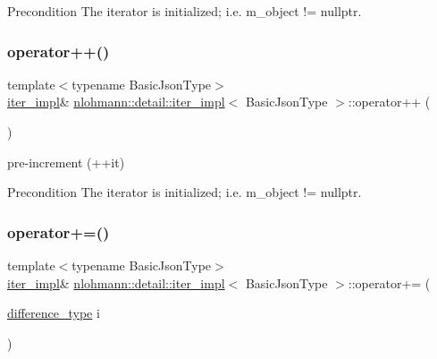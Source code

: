 \begin{DoxyPrecond}{Precondition}
The iterator is initialized; i.\+e. {\ttfamily m\+\_\+object != nullptr}. 
\end{DoxyPrecond}
\mbox{\label{classnlohmann_1_1detail_1_1iter__impl_abdfe2a7f464400a7ab572782d14b922f}} 
\subsubsection{\texorpdfstring{operator++()}{operator++()}\hspace{0.1cm}{\footnotesize\ttfamily [2/2]}}
{\footnotesize\ttfamily template$<$typename Basic\+Json\+Type$>$ \\
\hyperlink{classnlohmann_1_1detail_1_1iter__impl}{iter\+\_\+impl}\& \hyperlink{classnlohmann_1_1detail_1_1iter__impl}{nlohmann\+::detail\+::iter\+\_\+impl}$<$ Basic\+Json\+Type $>$\+::operator++ (\begin{DoxyParamCaption}{ }\end{DoxyParamCaption})\hspace{0.3cm}{\ttfamily [inline]}}



pre-\/increment (++it) 

\begin{DoxyPrecond}{Precondition}
The iterator is initialized; i.\+e. {\ttfamily m\+\_\+object != nullptr}. 
\end{DoxyPrecond}
\mbox{\label{classnlohmann_1_1detail_1_1iter__impl_a3eef94f9d167046e7f773aeb6b78090c}} 
\subsubsection{\texorpdfstring{operator+=()}{operator+=()}}
{\footnotesize\ttfamily template$<$typename Basic\+Json\+Type$>$ \\
\hyperlink{classnlohmann_1_1detail_1_1iter__impl}{iter\+\_\+impl}\& \hyperlink{classnlohmann_1_1detail_1_1iter__impl}{nlohmann\+::detail\+::iter\+\_\+impl}$<$ Basic\+Json\+Type $>$\+::operator+= (\begin{DoxyParamCaption}\item[{\hyperlink{classnlohmann_1_1detail_1_1iter__impl_a2f7ea9f7022850809c60fc3263775840}{difference\+\_\+type}}]{i }\end{DoxyParamCaption})\hspace{0.3cm}{\ttfamily [inline]}}



